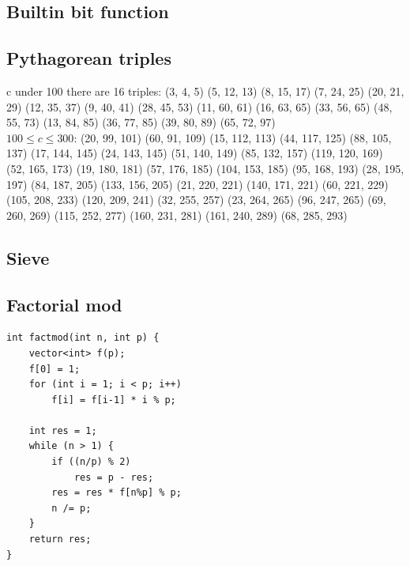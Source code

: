 \documentclass[A4 paper, 12pt, oneside, landscape]{article}
\begin{document}
\begin{multicols}{2}
	\subsection{Builtin bit function}
	
	
	\subsection{Pythagorean triples}
	c under 100 there are 16 triples:
	(3, 4, 5)	(5, 12, 13)	(8, 15, 17)	(7, 24, 25)
(20, 21, 29)	(12, 35, 37)	(9, 40, 41)	(28, 45, 53)
(11, 60, 61)	(16, 63, 65)	(33, 56, 65)	(48, 55, 73)
(13, 84, 85)	(36, 77, 85)	(39, 80, 89)	(65, 72, 97) \\

	$100 \leq c \leq 300$:
	(20, 99, 101)	(60, 91, 109)	(15, 112, 113)	(44, 117, 125)
(88, 105, 137)	(17, 144, 145)	(24, 143, 145)	(51, 140, 149)
(85, 132, 157)	(119, 120, 169)	(52, 165, 173)	(19, 180, 181)
(57, 176, 185)	(104, 153, 185)	(95, 168, 193)	(28, 195, 197)
(84, 187, 205)	(133, 156, 205)	(21, 220, 221)	(140, 171, 221)
(60, 221, 229)	(105, 208, 233)	(120, 209, 241)	(32, 255, 257)
(23, 264, 265)	(96, 247, 265)	(69, 260, 269)	(115, 252, 277)
(160, 231, 281)	(161, 240, 289)	(68, 285, 293)

	\subsection{Sieve}
	

    \subsection{Factorial mod}
    \begin{lstlisting}
int factmod(int n, int p) {
    vector<int> f(p);
    f[0] = 1;
    for (int i = 1; i < p; i++)
        f[i] = f[i-1] * i % p;

    int res = 1;
    while (n > 1) {
        if ((n/p) % 2)
            res = p - res;
        res = res * f[n%p] % p;
        n /= p;
    }
    return res; 
}
    \end{lstlisting}


\end{multicols}
\end{document}
